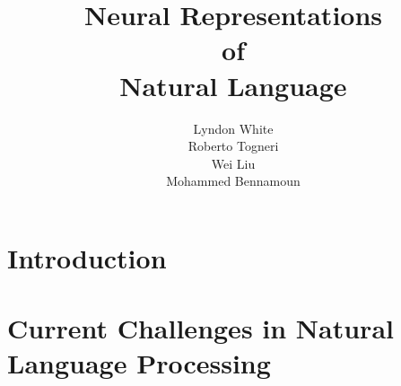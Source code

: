 \documentclass[12pt,parskip]{komatufte}
\begin{document}
\title{Neural Representations \\of\\ Natural Language}
\author{Lyndon White\\ Roberto Togneri\\ Wei Liu\\ Mohammed Bennamoun}
\publishers{SpringerBriefs in Computer Science}

\maketitle
\tableofcontents

\chapter{Introduction}\label{sec:introduction}





\chapter{Current Challenges in Natural Language Processing}\label{sec:current-challenges-in-natural-language-processing}

\end{document}
